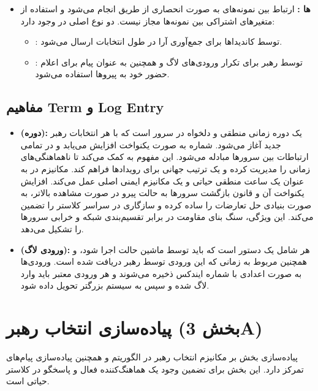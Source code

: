 \documentclass[12pt,a4paper]{article}
\begin{document}
\begin{itemize}
    \item \textbf{ها :} ارتباط بین نمونه‌های  به صورت انحصاری از طریق  انجام می‌شود و استفاده از متغیرهای اشتراکی بین نمونه‌ها مجاز نیست. دو نوع  اصلی در  وجود دارد:
    \begin{itemize}
        \item {}: توسط کاندیداها برای جمع‌آوری آرا در طول انتخابات ارسال می‌شود.
        \item {}: توسط رهبر برای تکرار ورودی‌های لاگ و همچنین به عنوان پیام  برای اعلام حضور خود به پیروها استفاده می‌شود.
    \end{itemize}
\end{itemize}

\subsection{مفاهیم Term و Log Entry}

\begin{itemize}
    \item \textbf{ (دوره):}  یک دوره زمانی منطقی و دلخواه در سرور است که با هر انتخابات رهبر جدید آغاز می‌شود. شماره  به صورت یکنواخت افزایش می‌یابد و در تمامی ارتباطات  بین سرورها مبادله می‌شود. این مفهوم به  کمک می‌کند تا ناهماهنگی‌های زمانی را مدیریت کرده و یک ترتیب جهانی برای رویدادها فراهم کند. مکانیزم  در  به عنوان یک ساعت منطقی حیاتی و یک مکانیزم ایمنی اصلی عمل می‌کند. افزایش یکنواخت آن و قانون بازگشت سرورها به حالت پیرو در صورت مشاهده  بالاتر، به صورت بنیادی حل تعارضات را ساده کرده و سازگاری در سراسر کلاستر را تضمین می‌کند. این ویژگی، سنگ بنای مقاومت  در برابر تقسیم‌بندی شبکه و خرابی سرورها را تشکیل می‌دهد.
    \item \textbf{ (ورودی لاگ):} هر  شامل یک دستور  است که باید توسط ماشین حالت اجرا شود، و همچنین  مربوط به زمانی که این ورودی توسط رهبر دریافت شده است. ورودی‌ها به صورت اعدادی با شماره ایندکس  ذخیره می‌شوند و هر ورودی معتبر باید وارد لاگ شده و سپس به سیستم بزرگتر تحویل داده شود.
\end{itemize}

\section{پیاده‌سازی انتخاب رهبر (بخش 3A)}

پیاده‌سازی بخش  بر مکانیزم انتخاب رهبر در الگوریتم  و همچنین پیاده‌سازی پیام‌های  تمرکز دارد. این بخش برای تضمین وجود یک هماهنگ‌کننده فعال و پاسخگو در کلاستر حیاتی است.
\end{document}
